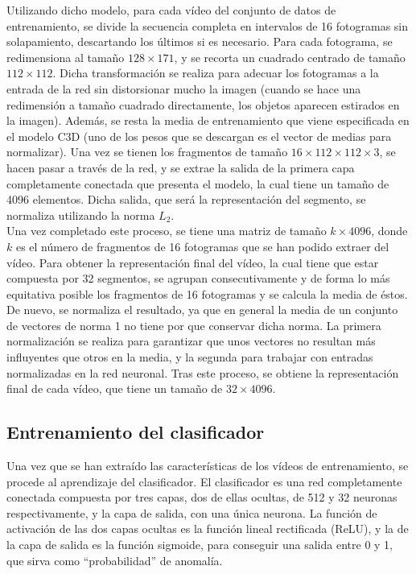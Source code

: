 \documentclass[../main.tex]{memoir}
\begin{document}
Utilizando dicho modelo, para cada vídeo del conjunto de datos de
entrenamiento, se divide la secuencia completa en intervalos de 16
fotogramas sin solapamiento, descartando los últimos si es necesario.
Para cada fotograma, se redimensiona al tamaño $128 \times 171$, y se
recorta un cuadrado centrado de tamaño $112 \times 112$. Dicha
transformación se realiza para adecuar los fotogramas a la entrada de
la red sin distorsionar mucho la imagen (cuando se hace una
redimensión a tamaño cuadrado directamente, los objetos aparecen
estirados en la imagen). Además, se resta la media de entrenamiento
que viene especificada en el modelo C3D (uno de los pesos que se
descargan es el vector de medias para normalizar). Una vez se tienen
los fragmentos de tamaño $16 \times 112 \times 112 \times 3$, se hacen
pasar a través de la red, y se extrae la salida de la primera capa
completamente conectada que presenta el modelo, la cual tiene un
tamaño de 4096 elementos. Dicha salida, que será la representación del
segmento, se normaliza utilizando la norma $L_2$.\\

Una vez completado este proceso, se tiene una matriz de tamaño
$k \times 4096$, donde $k$ es el número de fragmentos de 16 fotogramas
que se han podido extraer del vídeo. Para obtener la representación
final del vídeo, la cual tiene que estar compuesta por 32 segmentos,
se agrupan consecutivamente y de forma lo más equitativa posible los
fragmentos de 16 fotogramas y se calcula la media de éstos. De nuevo,
se normaliza el resultado, ya que en general la media de un conjunto
de vectores de norma 1 no tiene por que conservar dicha norma. La
primera normalización se realiza para garantizar que unos vectores no
resultan más influyentes que otros en la media, y la segunda para
trabajar con entradas normalizadas en la red neuronal. Tras este
proceso, se obtiene la representación final de cada vídeo, que
tiene un tamaño de $32 \times 4096$.

\subsection{Entrenamiento del clasificador}

Una vez que se han extraído las características de los vídeos de
entrenamiento, se procede al aprendizaje del clasificador. El
clasificador es una red completamente conectada compuesta por tres
capas, dos de ellas ocultas, de 512 y 32 neuronas respectivamente, y
la capa de salida, con una única neurona. La función de activación de
las dos capas ocultas es la función lineal rectificada (ReLU), y la de
la capa de salida es la función sigmoide, para conseguir una salida
entre 0 y 1, que sirva como ``probabilidad'' de anomalía.\\
\end{document}
